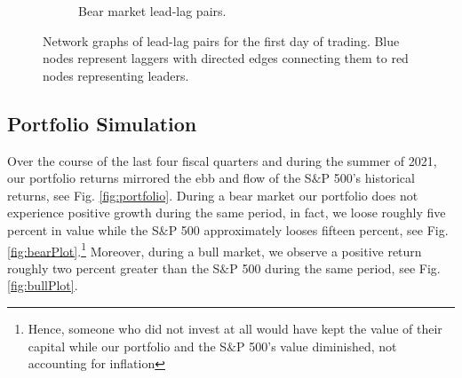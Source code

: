 \documentclass{article}
\begin{document}
\begin{figure}[H]
\begin{subfigure}{0.45\textwidth}
        \caption{Bear market lead-lag pairs.}
        \label{fig:bearNetwork}
    \end{subfigure}
    \caption{Network graphs of lead-lag pairs for the first day of trading. Blue nodes represent laggers with directed edges connecting them to red nodes representing leaders.}
    \label{fig:networks}
\end{figure}
\subsection{Portfolio Simulation}
Over the course of the last four fiscal quarters and during the summer of 2021, our portfolio returns mirrored the ebb and flow of the S$\&$P 500's historical returns, see Fig. \ref{fig:portfolio}. During a bear market our portfolio does not experience positive growth during the same period, in fact, we loose roughly five percent in value while the S$\&$P 500 approximately looses fifteen percent, see Fig. \ref{fig:bearPlot}.\footnote{Hence, someone who did not invest at all would have kept the value of their capital while our portfolio and the S$\&$P 500's value diminished, not accounting for inflation} Moreover, during a bull market, we observe a positive return roughly two percent greater than the S$\&$P 500 during the same period, see Fig. \ref{fig:bullPlot}.
\end{document}
